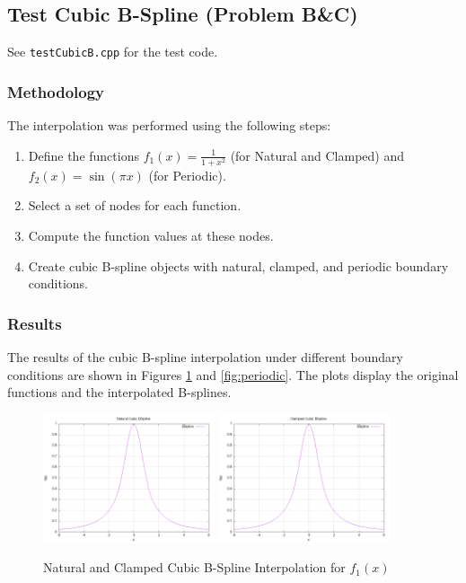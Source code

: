\documentclass{article}
\begin{document}
\subsection{Test Cubic B-Spline (Problem B\&C)}
See \texttt{testCubicB.cpp} for the test code.
\subsubsection{Methodology}
The interpolation was performed using the following steps:
\begin{enumerate}
    \item Define the functions \( f_1(x) = \frac{1}{1 + x^2} \) (for Natural and Clamped) and \( f_2(x) = \sin(\pi x) \) (for Periodic).
    \item Select a set of nodes for each function.
    \item Compute the function values at these nodes.
    \item Create cubic B-spline objects with natural, clamped, and periodic boundary conditions.
\end{enumerate}

\subsubsection{Results}
The results of the cubic B-spline interpolation under different boundary conditions are shown in Figures \ref{fig:natural} and \ref{fig:periodic}. The plots display the original functions and the interpolated B-splines.

\begin{figure}[H]
    \centering
    \includegraphics[width=0.45\textwidth]{../figure/NCBspline_plot.png}
    \includegraphics[width=0.45\textwidth]{../figure/CCBspline_plot.png}
    \caption{Natural and Clamped Cubic B-Spline Interpolation for \( f_1(x) \)}
    \label{fig:natural}
\end{figure}
\end{document}
